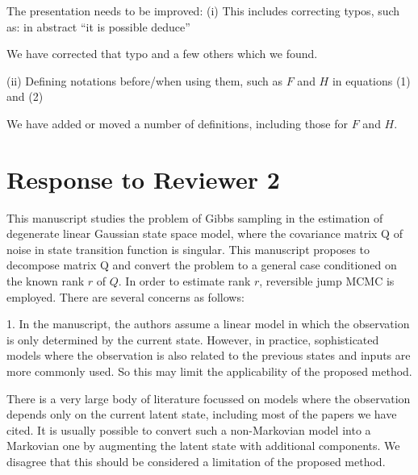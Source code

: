 \documentclass{article}
\newenvironment{review}[0]{\begin{itshape}\color{Gray}\noindent}{\end{itshape}\vspace{0.4cm}}
\newenvironment{response}[0]{\noindent}{\vspace{0.4cm}}
\begin{document}
\begin{review}
The presentation needs to be improved:
(i) This includes correcting typos, such as: in abstract ``it is possible deduce''
\end{review}

\begin{response}
 We have corrected that typo and a few others which we found.
\end{response}

\begin{review}
(ii) Defining notations before/when using them, such as $F$ and $H$ in equations (1) and (2)
\end{review}

\begin{response}
 We have added or moved a number of definitions, including those for $F$ and $H$.
\end{response}



\section*{Response to Reviewer 2}

\begin{review}
This manuscript studies the problem of Gibbs sampling in the estimation of degenerate linear Gaussian state space model, where the covariance matrix Q of noise in state transition function is singular. This manuscript proposes to decompose matrix Q and convert the problem to a general case conditioned on the known rank $r$ of $Q$. In order to estimate rank $r$, reversible jump MCMC is employed. There are several concerns as follows:

1.  In the manuscript, the authors assume a linear model in which the observation is only determined by the current state. However, in practice, sophisticated models where the observation is also related to the previous states and inputs are more commonly used. So this may limit the applicability of the proposed method.
\end{review}

\begin{response}
 There is a very large body of literature focussed on models where the observation depends only on the current latent state, including most of the papers we have cited. It is usually possible to convert such a non-Markovian model into a Markovian one by augmenting the latent state with additional components. We disagree that this should be considered a limitation of the proposed method.
\end{response}
\end{document}
